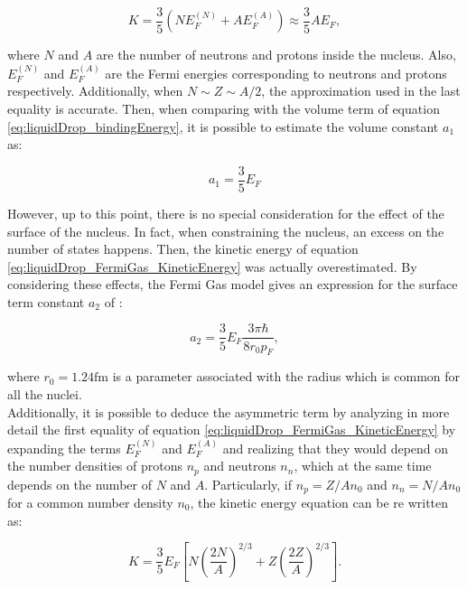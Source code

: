 \documentclass[openany]{book}
\begin{document}
\begin{equation}\label{eq:liquidDrop_FermiGas_KineticEnergy}
	K = \frac{3}{5} \left( N E^{(N)}_F + A E^{(A)}_F \right) \approx \frac{3}{5} A E_F,
\end{equation}

where $N$ and $A$ are the number of neutrons and protons inside the nucleus. Also, $E^{(N)}_F $ and $E^{(A)}_F$ are the Fermi energies corresponding to neutrons and protons respectively.  Additionally, when $N \sim Z \sim A/2$, the approximation used in the last equality is accurate. Then, when comparing with the volume term of equation \ref{eq:liquidDrop_bindingEnergy}, it is possible to estimate the volume constant $a_1$ as: 

\begin{equation}\label{eq:liquidDrop_FermiGas_volumeConstant}
	a_1= \frac{3}{5}E_F
\end{equation}

However, up to this point, there is no special consideration for the effect of the surface of the nucleus. In fact, when constraining the nucleus, an excess on the number of states happens. Then, the kinetic energy of equation \ref{eq:liquidDrop_FermiGas_KineticEnergy} was actually overestimated. By considering these effects, the Fermi Gas model gives an expression for the surface term constant $a_2$ of \cite{basdevant_rich_spiro_2004}: 

\begin{equation}\label{eq:liquidDrop_FermiGas_surfaceConstant}
	a_2= \frac{3}{5}E_F \frac{ 3 \pi \hbar }{8 r_0 p_F},
\end{equation}

where $r_0 = 1.24\mathrm{fm}$ is a parameter associated with the radius which is common for all the nuclei. \\

Additionally, it is possible to deduce the asymmetric term by analyzing in more detail the first equality of equation \ref{eq:liquidDrop_FermiGas_KineticEnergy} by expanding the terms $E^{(N)}_F$ and $E^{(A)}_F$ and realizing that they would depend on the number densities of protons $n_p$ and neutrons $n_n$, which at the same time depends on the number of $N$ and $A$. Particularly, if $n_p = Z/A n_0$ and $n_n = N/A n_0$ for a common number density $n_0$, the kinetic energy equation can be re written as: 

\begin{equation}\label{eq:liquidDrop_FermiGas_asymmetric}
	K = \frac{3}{5}E_F \left [ N \left ( \frac{2N}{A} \right )^{2/3}  + Z \left ( \frac{2Z}{A} \right )^{2/3}  \right  ]. 
\end{equation}
\end{document}
